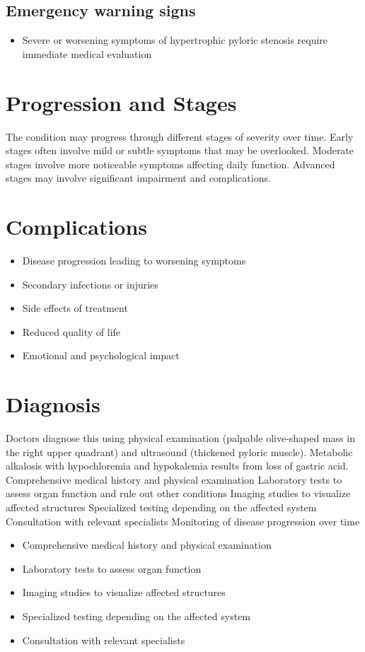\subsection{Emergency warning signs}
\begin{itemize}[noitemsep]
  \item Severe or worsening symptoms of hypertrophic pyloric stenosis require immediate medical evaluation
\end{itemize}
\section{Progression and Stages}
The condition may progress through different stages of severity over time. Early stages often involve mild or subtle symptoms that may be overlooked. Moderate stages involve more noticeable symptoms affecting daily function. Advanced stages may involve significant impairment and complications.
\section{Complications}
\begin{itemize}[noitemsep]
  \item Disease progression leading to worsening symptoms
  \item Secondary infections or injuries
  \item Side effects of treatment
  \item Reduced quality of life
  \item Emotional and psychological impact
\end{itemize}
\section{Diagnosis}
Doctors diagnose this using physical examination (palpable olive-shaped mass in the right upper quadrant) and ultrasound (thickened pyloric muscle). Metabolic alkalosis with hypochloremia and hypokalemia results from loss of gastric acid. Comprehensive medical history and physical examination Laboratory tests to assess organ function and rule out other conditions Imaging studies to visualize affected structures Specialized testing depending on the affected system Consultation with relevant specialists Monitoring of disease progression over time

\begin{itemize}[noitemsep]
  \item Comprehensive medical history and physical examination
  \item Laboratory tests to assess organ function
  \item Imaging studies to visualize affected structures
  \item Specialized testing depending on the affected system
  \item Consultation with relevant specialists
\end{itemize}
